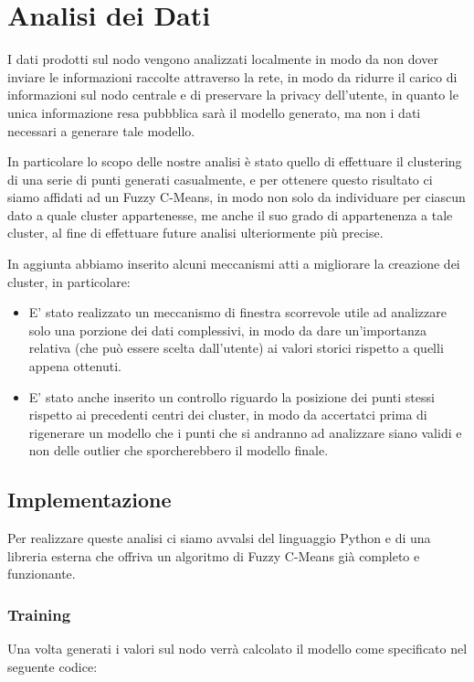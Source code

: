 \chapter{Analisi dei Dati}
I dati prodotti sul nodo vengono analizzati localmente in modo da non dover inviare le informazioni raccolte attraverso la rete, in modo da ridurre il carico di informazioni sul nodo centrale
e di preservare la privacy dell'utente, in quanto le unica informazione resa pubbblica sarà il modello generato, ma non i dati necessari a generare tale modello.

In particolare lo scopo delle nostre analisi è stato quello di effettuare il clustering di una serie di punti generati casualmente, e per ottenere questo risultato ci siamo affidati ad un Fuzzy C-Means, in modo
non solo da individuare per ciascun dato a quale cluster appartenesse, me anche il suo grado di appartenenza a tale cluster, al fine di effettuare future analisi ulteriormente più precise.

In aggiunta abbiamo inserito alcuni meccanismi atti a migliorare la creazione dei cluster, in particolare:
\begin{itemize}
  \item E' stato realizzato un meccanismo di finestra scorrevole utile ad analizzare solo una porzione dei dati complessivi, in modo da dare un'importanza relativa (che può essere scelta dall'utente) ai valori storici rispetto a quelli appena ottenuti.
  \item E' stato anche inserito un controllo riguardo la posizione dei punti stessi rispetto ai precedenti centri dei cluster, in modo da accertatci prima di rigenerare un modello che i punti che si andranno ad analizzare siano validi e non delle outlier che sporcherebbero il modello finale.
\end{itemize}

\section{Implementazione}

Per realizzare queste analisi ci siamo avvalsi del linguaggio Python e di una libreria esterna che offriva un algoritmo di Fuzzy C-Means già completo e funzionante.

\subsection{Training}

Una volta generati i valori sul nodo verrà calcolato il modello come specificato nel seguente codice:

